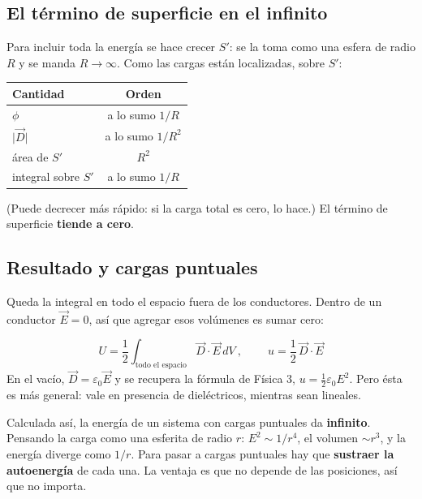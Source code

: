 \documentclass[12pt,a4paper]{article}
\begin{document}
\subsection{El término de superficie en el infinito}

Para incluir toda la energía se hace crecer $S'$: se la toma como una esfera de
radio $R$ y se manda $R\to\infty$. Como las cargas están localizadas, sobre $S'$:

\begin{table}[H]
  \centering
  \begin{tabular}{lc}
    \toprule
    Cantidad & Orden \\
    \midrule
    $\phi$ & a lo sumo $1/R$ \\
    $\lvert\vec D\rvert$ & a lo sumo $1/R^2$ \\
    área de $S'$ & $R^2$ \\
    integral sobre $S'$ & a lo sumo $1/R$ \\
    \bottomrule
  \end{tabular}
\end{table}

(Puede decrecer más rápido: si la carga total es cero, lo hace.) El término de
superficie \textbf{tiende a cero}.

\subsection{Resultado y cargas puntuales}

Queda la integral en todo el espacio fuera de los conductores. Dentro de un
conductor $\vec E = 0$, así que agregar esos volúmenes es sumar cero:

\begin{keybox}
\[
\boxed{\ U = \frac12\int_{\text{todo el espacio}}\vec D\cdot\vec E\,dV\ },
\qquad
\boxed{\ u = \frac12\,\vec D\cdot\vec E\ }
\]
En el vacío, $\vec D = \varepsilon_0\vec E$ y se recupera la fórmula de Física 3,
$u = \tfrac12\varepsilon_0E^2$. Pero ésta es más general: vale en presencia de
dieléctricos, mientras sean lineales.
\end{keybox}

\begin{warnbox}
Calculada así, la energía de un sistema con cargas puntuales da
\textbf{infinito}. Pensando la carga como una esferita de radio $r$:
$E^2\sim 1/r^4$, el volumen $\sim r^3$, y la energía diverge como $1/r$. Para
pasar a cargas puntuales hay que \textbf{sustraer la autoenergía} de cada una. La
ventaja es que no depende de las posiciones, así que no importa.
\end{warnbox}
\end{document}
